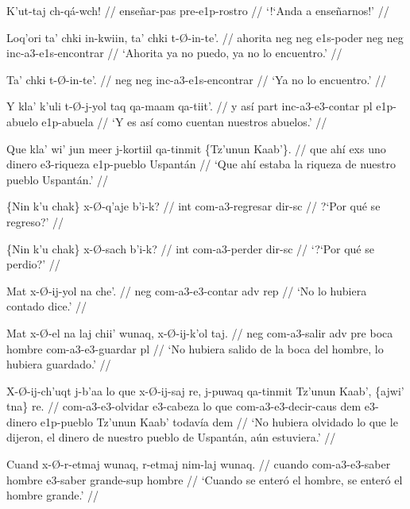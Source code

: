 \documentclass[12pt]{article}
\begin{document}
\ex
\begingl
  \gla  K'ut-taj ch-q\'a-wch! //
  \glb ense\~nar-pas pre-e1p-rostro //
  \glft `!`Anda a ense\~narnos!' //
\endgl
\xe

\ex
\begingl
  \gla  Loq'ori ta' chki in-kwiin, ta' chki t-\O-in-te'. //
  \glb  ahorita neg neg e1s-poder neg neg inc-a3-e1s-encontrar //
  \glft `Ahorita ya no puedo, ya no lo encuentro.' //
\endgl
\xe

\ex
\begingl
  \gla  Ta' chki t-\O-in-te'. //
  \glb  neg neg inc-a3-e1s-encontrar //
  \glft `Ya no lo encuentro.' //
\endgl
\xe


\ex
\begingl
  \gla  Y kla' k'uli t-\O-j-yol taq qa-maam qa-tiit'. //
  \glb  y as\'i part inc-a3-e3-contar pl e1p-abuelo e1p-abuela //
  \glft `Y es as\'i como cuentan nuestros abuelos.' //
\endgl
\xe

\ex
\begingl
  \gla  Que kla' wi' jun meer j-kortiil qa-tinmit \{Tz'unun Kaab'\}. //
  \glb  que ah\'i exs uno dinero e3-riqueza e1p-pueblo Uspant\'an //
  \glft `Que ah\'i estaba la riqueza de nuestro pueblo Uspant\'an.' //
\endgl
\xe

\ex
\begingl
  \gla  \{Nin k'u chak\} x-\O-q'aje b'i-k? //
  \glb  int com-a3-regresar dir-sc  //
  \glft ?`Por qu\'e se regreso?' //
\endgl
\xe

\ex
\begingl
  \gla  \{Nin k'u chak\} x-\O-sach b'i-k? //
  \glb int com-a3-perder dir-sc //
  \glft `?`Por qu\'e se perdio?' //
\endgl
\xe

\ex
\begingl
  \gla  Mat x-\O-ij-yol na che'. //
  \glb neg com-a3-e3-contar adv rep //
  \glft `No lo hubiera contado dice.' //
\endgl
\xe


\ex
\begingl
  \gla  Mat x-\O-el na laj chii' wunaq, x-\O-ij-k'ol taj. //
  \glb neg com-a3-salir adv pre boca hombre com-a3-e3-guardar pl //
  \glft `No hubiera salido de la boca del hombre, lo hubiera guardado.' //
\endgl
\xe

\ex
\begingl
  \gla X-\O-ij-ch'uqt j-b'aa lo que x-\O-ij-saj re, j-puwaq qa-tinmit Tz'unun Kaab', \{ajwi' tna\} re. //
  \glb com-a3-e3-olvidar e3-cabeza lo que com-a3-e3-decir-caus dem e3-dinero e1p-pueblo Tz'unun Kaab' todav\'ia dem //
  \glft `No hubiera olvidado lo que le dijeron, el dinero de nuestro pueblo de Uspant\'an, a\'un estuviera.' //
\endgl
\xe

\ex
\begingl
  \gla  Cuand x-\O-r-etmaj wunaq, r-etmaj nim-laj wunaq. //
  \glb cuando com-a3-e3-saber hombre e3-saber grande-sup hombre //
  \glft `Cuando se enter\'o el hombre, se enter\'o el hombre grande.' //
\endgl
\xe

\ex
\xe
\end{document}

